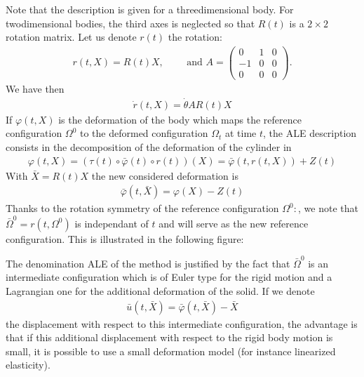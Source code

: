 \documentclass[a4paper,11pt,english]{sphinxmanual}
\begin{document}
Note that the description is given for a three\sphinxhyphen{}dimensional body. For two\sphinxhyphen{}dimensional bodies, the third axes is neglected so that \(R(t)\) is a \(2\times 2\) rotation matrix. Let us denote \(r(t)\) the rotation:
\begin{equation*}
\begin{split}r(t,X) = R(t)X, ~~~~~~~~~ \mbox{ and }
A = \left(\begin{array}{ccc}
0 & 1 & 0 \\
-1 & 0 & 0 \\
0 & 0 & 0
\end{array} \right).\end{split}
\end{equation*}
We have then
\begin{equation*}
\begin{split}\dot{r}(t,X) = \dot{\theta}AR(t)X\end{split}
\end{equation*}
If \(\varphi(t, X)\) is the deformation of the body which maps the reference configuration \(\Omega^0\) to the deformed configuration \(\Omega_t\) at time \(t\), the ALE description consists in the decomposition of the deformation of the cylinder in
\begin{equation*}
\begin{split}\varphi(t, X) = (\tau(t) \circ \bar{\varphi}(t) \circ r(t))(X) = \bar{\varphi}(t, r(t, X)) + Z(t)\end{split}
\end{equation*}
With \(\bar{X} = R(t)X\) the new considered deformation is
\begin{equation*}
\begin{split}\bar{\varphi}(t,\bar{X}) = \varphi(X) - Z(t)\end{split}
\end{equation*}
Thanks to the rotation symmetry of the reference configuration \(\Omega^0:\), we note that \(\bar{\Omega}^0 = r(t, \Omega^0)\) is independant of \(t\) and will serve as the new reference configuration. This is illustrated in the following figure:

\begin{figure}[htbp]
\centering

\noindent{}
\end{figure}

The denomination ALE of the method is justified by the fact that \(\bar{\Omega}^0\) is an intermediate configuration which is of Euler type for the rigid motion and a Lagrangian one for the additional deformation of the solid. If we denote
\begin{equation*}
\begin{split}\bar{u}(t,\bar{X}) = \bar{\varphi}(t, \bar{X}) - \bar{X}\end{split}
\end{equation*}
the displacement with respect to this intermediate configuration, the advantage is that if this additional displacement with respect to the rigid body motion is small, it is possible to use a small deformation model (for instance linearized elasticity).
\end{document}
